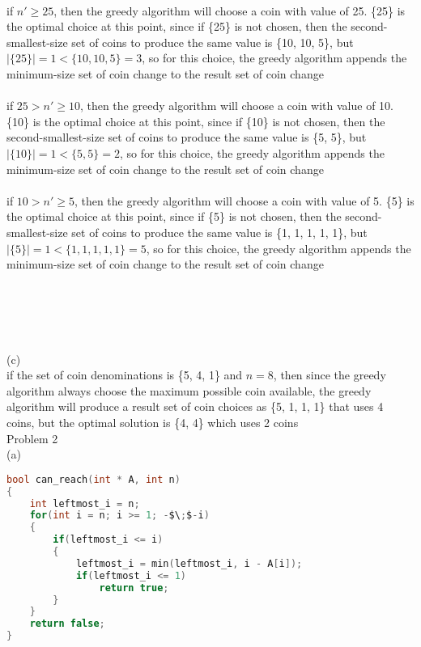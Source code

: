 \documentclass[12pt,border=4pt,multi]{article} %
\begin{document}
\\
if $n' \geq 25$, then the greedy algorithm will choose a coin with value of 25. \{25\} is the optimal choice at this point, since if \{25\} is not chosen, then the second-smallest-size set of coins to produce the same value is \{10, 10, 5\}, but $|\{25\}| = 1 < \{10, 10, 5\} = 3$, so for this choice, the greedy algorithm appends the minimum-size set of coin change to the result set of coin change\\
\\
if $25 > n' \geq 10$, then the greedy algorithm will choose a coin with value of 10. \{10\} is the optimal choice at this point, since if \{10\} is not chosen, then the second-smallest-size set of coins to produce the same value is \{5, 5\}, but $|\{10\}| = 1 < \{5, 5\} = 2$, so for this choice, the greedy algorithm appends the minimum-size set of coin change to the result set of coin change\\
\\
if $10 > n' \geq 5$, then the greedy algorithm will choose a coin with value of 5. \{5\} is the optimal choice at this point, since if \{5\} is not chosen, then the second-smallest-size set of coins to produce the same value is \{1, 1, 1, 1, 1\}, but $|\{5\}| = 1 < \{1, 1, 1, 1, 1\} = 5$, so for this choice, the greedy algorithm appends the minimum-size set of coin change to the result set of coin change\\
\\
\\
\\
\\
\\
(c)\\
if the set of coin denominations is \{5, 4, 1\} and $n = 8$, then since the greedy algorithm always choose the maximum possible coin available, the greedy algorithm will produce a result set of coin choices as \{5, 1, 1, 1\} that uses 4 coins, but the optimal solution is \{4, 4\} which uses 2 coins\\
\newpage
\noindent
Problem 2\\
(a)
\begin{lstlisting}[language = c, mathescape = true]
bool can_reach(int * A, int n)
{
    int leftmost_i = n;
    for(int i = n; i >= 1; -$\;$-i)
    {
        if(leftmost_i <= i)
        {
            leftmost_i = min(leftmost_i, i - A[i]);
            if(leftmost_i <= 1)
                return true;
        }
    }
    return false;
}
\end{lstlisting}
\leavevmode
\\
\end{document}
